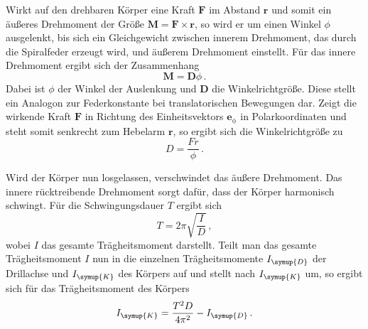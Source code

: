 Wirkt auf den drehbaren Körper eine Kraft $\symbf{F}$ im Abstand $\symbf{r}$ und somit ein
äußeres Drehmoment der Größe $\symbf{M}=\symbf{F}\times\symbf{r}$, so wird er um
einen Winkel $\phi$ ausgelenkt, bis sich ein Gleichgewicht zwischen innerem Drehmoment,
das durch die Spiralfeder erzeugt wird, und äußerem Drehmoment einstellt. Für das innere
Drehmoment ergibt sich der Zusammenhang
\begin{equation}
  \symbf{M}=\symbf{D}\phi\,.
  \label{eqn:drehmoment_innen}
\end{equation}
Dabei ist $\phi$ der Winkel der Auslenkung und $\symbf{D}$ die Winkelrichtgröße.
Diese stellt ein Analogon zur Federkonstante bei translatorischen Bewegungen dar.
Zeigt die wirkende Kraft $\symbf{F}$ in Richtung des Einheitsvektors $\symbf{e}_\mathrm{{\phi}}$
in Polarkoordinaten und steht somit senkrecht zum Hebelarm $\symbf{r}$, so ergibt sich
die Winkelrichtgröße zu
\begin{equation}
  {D}=\frac{Fr}{\phi}\,.
  \label{eqn:winkelrg}
\end{equation}

Wird der Körper nun losgelassen, verschwindet das äußere Drehmoment. Das innere
rücktreibende Drehmoment sorgt dafür, dass der Körper harmonisch schwingt.
Für die Schwingungsdauer $T$ ergibt sich
\begin{equation}
  T=2\pi\sqrt{\frac{I}{D}}\,,
  \label{eqn:schwingung}
\end{equation}
wobei $I$ das gesamte Trägheitsmoment darstellt. Teilt man das gesamte Trägheitsmoment
$I$ nun in die einzelnen Trägheitsmomente $I_{\symup{D}}$ der Drillachse und
$I_{\symup{K}}$ des Körpers auf und stellt nach $I_{\symup{K}}$ um, so ergibt sich für
das Trägheitsmoment des Körpers
\begin{equation}
  I_{\symup{K}}=\frac{T^2D}{4\pi^2}-I_{\symup{D}}\,.
  \label{eqn:traegheitschwingung}
\end{equation}

